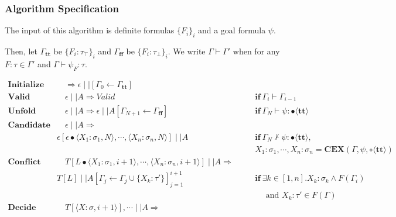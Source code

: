 \documentclass[runningheads]{llncs}
\newcommand\COL{\mathbin{:}}
\newcommand \true {\textbf{tt}}
\newcommand \false {\textbf{ff}}
\newcommand \stypebool {\bullet}
\newcommand \stypeboolf {\circ}
\newcommand \typebool[1]{\stypebool \langle #1 \rangle}
\newcommand \typeboolf[1]{\stypeboolf \langle #1 \rangle}
\newcommand {\conflict}{\wedge}
\begin{document}
\subsubsection{Algorithm Specification}

The input of this algorithm is definite formulas \(\{F_i\}_i\) and a goal formula
\(\psi\).

Then, let \( \Gamma_\true \) be \( \{F_i: \tau_\top\}_i \)
and \( \Gamma_\false \) be \( \{F_i: \tau_\bot \}_i \).
We write \( \Gamma \vdash \Gamma' \) when for any \( F \COL \tau \in \Gamma' \)
and \( \Gamma \vdash \psi_F \COL \tau \).

\begin{align*}
    \textbf{Initialize} &\quad
        \Longrightarrow
        \epsilon \mid \mid [\Gamma_0 \leftarrow \Gamma_\true]
        &&\\
    \textbf{Valid} &\quad
        \epsilon \mid \mid A \Longrightarrow \textit{Valid}
        &&\quad \textbf{if} \ \Gamma_{i} \vdash \Gamma_{i-1}
        \\
    \textbf{Unfold} &\quad
        \epsilon \mid \mid A \Longrightarrow
        \epsilon \mid \mid A[\Gamma_{N+1} \leftarrow \Gamma_\false]
        &&\quad \textbf{if} \ \Gamma_{N} \vdash \psi: \typebool{\true}
        \\
    \textbf{Candidate} &\quad
        \epsilon \mid \mid A
        \Longrightarrow&&\\
        & \epsilon[\epsilon \bullet \langle X_1 \COL \sigma_1, N \rangle, \cdots, \langle X_n \COL \sigma_n, N \rangle]\mid \mid A
        && \quad \textbf{if} \ \Gamma_N \not \vdash \psi \COL
        \typebool{\true},\\
        &&&\quad  X_1 \COL \sigma_1 , \cdots, X_n \COL \sigma_n= \textbf{CEX}(\Gamma, \psi, \typeboolf{\true})
        \\
    \textbf{Conflict} &\quad
        T[L \bullet \langle X_1: \sigma_1, i + 1 \rangle, \cdots,
                     \langle X_n: \sigma_n, i + 1 \rangle
        ] \mid \mid A
        \Longrightarrow&&\\
        & T[L]
        \mid \mid A[\Gamma_j \leftarrow \Gamma_j \cup \{X_k: \tau'\}]_{j=1}^{i+1}
        &&\quad \textbf{if} \  \exists k \in [1, n].
        X_k \COL \sigma_k \conflict F(\Gamma_i) \\
        &&&\quad \quad \text{ and } X_k \COL \tau' \in F(\Gamma)
        \\
    \textbf{Decide} &\quad
         T[\langle X: \sigma, i + 1 \rangle], \cdots\mid \mid A
        \Longrightarrow&&\\

\end{align*}
\end{document}
